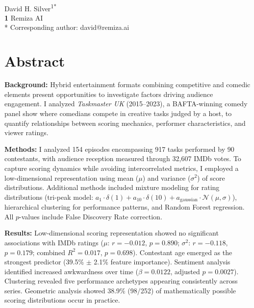 \documentclass[10pt,letterpaper]{article}
\begin{document}
\vspace*{0.2in}

\begin{flushleft}
{\Large
\textbf{}
}
\newline
\\
David H. Silver\textsuperscript{1*}
\\
\bigskip
\textbf{1} Remiza AI\\
\bigskip
* Corresponding author: david@remiza.ai
\end{flushleft}

\section*{Abstract}
\textbf{Background:} Hybrid entertainment formats combining competitive and comedic elements present opportunities to investigate factors driving audience engagement. I analyzed \textit{Taskmaster UK} (2015--2023), a BAFTA-winning comedy panel show where comedians compete in creative tasks judged by a host, to quantify relationships between scoring mechanics, performer characteristics, and viewer ratings.

\textbf{Methods:} I analyzed 154 episodes encompassing 917 tasks performed by 90 contestants, with audience reception measured through 32{,}607 IMDb votes. To capture scoring dynamics while avoiding intercorrelated metrics, I employed a low-dimensional representation using mean ($\mu$) and variance ($\sigma^2$) of score distributions. Additional methods included mixture modeling for rating distributions (tri-peak model: $a_1\cdot\delta(1) + a_{10}\cdot\delta(10) + a_{\text{gaussian}}\cdot\mathcal{N}(\mu,\sigma)$), hierarchical clustering for performance patterns, and Random Forest regression. All $p$-values include False Discovery Rate correction.

\textbf{Results:} Low-dimensional scoring representation showed no significant associations with IMDb ratings ($\mu$: $r = -0.012$, $p = 0.890$; $\sigma^2$: $r = -0.118$, $p = 0.179$; combined $R^2 = 0.017$, $p = 0.698$). Contestant age emerged as the strongest predictor (39.5\% $\pm$ 2.1\% feature importance). Sentiment analysis identified increased awkwardness over time ($\beta = 0.0122$, adjusted $p = 0.0027$). Clustering revealed five performance archetypes appearing consistently across series. Geometric analysis showed 38.9\% (98/252) of mathematically possible scoring distributions occur in practice.
\end{document}
